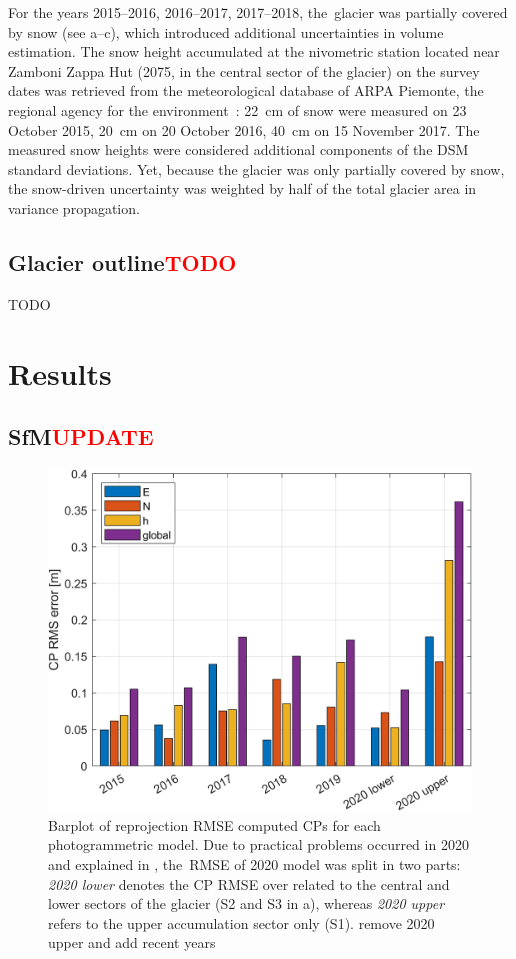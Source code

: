For the years 2015--2016, 2016--2017, 2017--2018, the~glacier was partially covered by
snow (see a--c), which introduced additional uncertainties in
volume estimation.
The snow height accumulated at the nivometric station located near Zamboni Zappa Hut
(\SI{2075}{\masl}, in the central sector of the glacier) on the survey dates was retrieved
from the meteorological database of ARPA Piemonte, the regional agency for the
environment~\citep{arpaPie}: \SI{22}{\centi\meter} of snow were measured on 23 October
2015, \SI{20}{\centi\meter} on 20 October 2016, \SI{40}{\centi\meter} on 15 November 2017.
The measured snow heights were considered additional components of the DSM standard
deviations.
Yet, because the glacier was only partially covered by snow, the snow-driven uncertainty
was weighted by half of the total glacier area in variance propagation.

\subsection{Glacier outline\textcolor{red}{TODO}}\label{sec:3:method_outline}

{\color{red} TODO}

\section{Results}\label{sec:3:res}

\subsection{SfM\textcolor{red}{UPDATE}}\label{sec:3:res:sfm}

\begin{figure}
    \centering
    \includegraphics[width=0.7\columnwidth]{CPrmse.png}
    \caption{Barplot of reprojection RMSE computed CPs for each photogrammetric
        model. Due to practical problems occurred in 2020 and explained in
        , the~RMSE of 2020 model was split in two parts:
        \textit{2020 lower} denotes the CP RMSE over related to the central and 
        lower sectors of the glacier (S2 and S3 in a), 
        whereas \textit{2020 upper} refers to the upper accumulation sector 
        only (S1). {\color{red} remove 2020 upper and add recent years}}
    \label{fig:3:CP_errors}
\end{figure}

